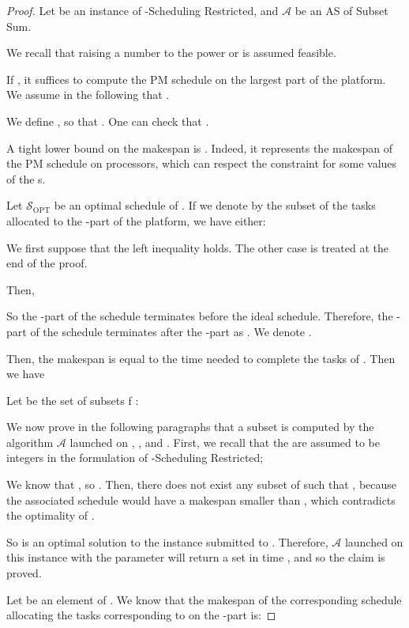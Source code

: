 \documentclass{llncs}
\newcommand{\newparskip}{\bigskip}
\newcommand{\sopt}{\ensuremath{\mathcal{S}_{\mathrm{OPT}}}\xspace}
\newcommand{\A}{\ensuremath{\mathcal A}\xspace}
\newcommand{\pqres}{ {\sc -Scheduling Restricted}\xspace}
\begin{document}
\begin{proof}

Let  be an instance of \pqres,  and \A be an AS of {\sc Subset Sum}.

We recall that raising a number to the power  or  is assumed feasible.

If , it suffices to compute the PM schedule on the largest part of the platform.
We assume in the following that .


We define , so that . One can check that .

A tight lower bound on the makespan is . Indeed, it represents the makespan of the PM schedule on  processors, which can respect the constraint for some values of the s. 


 Let \sopt be an optimal schedule of . If we denote by  the subset of the tasks allocated to the -part of the platform, we have either:



We first suppose that the left inequality holds. The other case is treated at the end of the proof.


Then,


So the -part of the schedule terminates before the ideal schedule. Therefore, the -part of the schedule terminates after the -part as .
We denote .


Then, the makespan  is equal to the time needed to complete the tasks of . Then we have 


Let  be the set of subsets f : 





We now prove in the following paragraphs that a subset  is computed by the algorithm \A launched on , , and . First, we recall that the  are assumed to be integers in the formulation of \pqres;

We know that , so .
Then, there does not exist any subset  of  such that , because the associated schedule  would have a makespan smaller than , which contradicts the optimality of .

So  is an optimal solution to the instance submitted to .
Therefore, \A launched on this instance with the parameter  will return a set  in time , and so the claim is proved.


\newparskip


Let  be an element of .
We know that the makespan  of the corresponding schedule  allocating the tasks corresponding to  on the -part is:





\end{proof}
\end{document}
